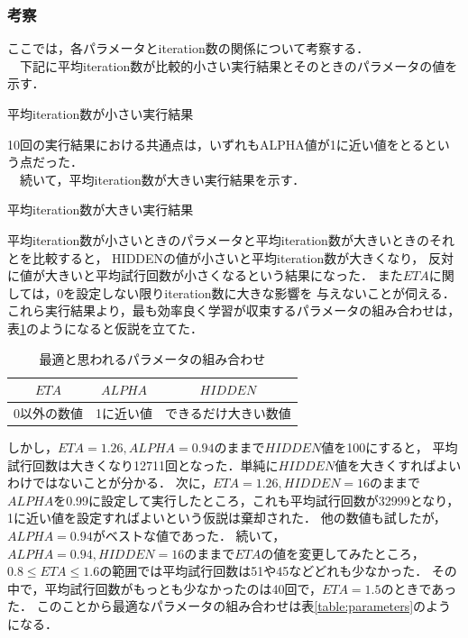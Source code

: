 \subsubsection{考察}
ここでは，各パラメータとiteration数の関係について考察する． \\
　下記に平均iteration数が比較的小さい実行結果とそのときのパラメータの値を示す．
\begin{itembox}[c]{平均iteration数が小さい実行結果}
    {\small
    }
\end{itembox}
10回の実行結果における共通点は，いずれもALPHA値が1に近い値をとるという点だった． \\
　続いて，平均iteration数が大きい実行結果を示す．

\begin{itembox}[c]{平均iteration数が大きい実行結果}
    {\small
    }
\end{itembox}

平均iteration数が小さいときのパラメータと平均iteration数が大きいときのそれとを比較すると，
HIDDENの値が小さいと平均iteration数が大きくなり，
反対に値が大きいと平均試行回数が小さくなるという結果になった．
また$ETA$に関しては，0を設定しない限りiteration数に大きな影響を
与えないことが伺える．
これら実行結果より，最も効率良く学習が収束するパラメータの組み合わせは，表\ref{table:parameters_prediction}のようになると仮説を立てた．

\begin{table}[htb]
 \begin{center}
  \begin{tabular}[htb]{|c|c|c|} \hline
   $ETA$ & $ALPHA$ & $HIDDEN$ \\ \hline \hline
   0以外の数値 & 1に近い値 & できるだけ大きい数値\\ \hline
  \end{tabular}
  \caption{最適と思われるパラメータの組み合わせ}
  \label{table:parameters_prediction}
 \end{center}
\end{table}

しかし，$ETA=1.26, ALPHA=0.94$のままで$HIDDEN$値を100にすると，
平均試行回数は大きくなり12711回となった．単純に$HIDDEN$値を大きくすればよいわけではないことが分かる．
次に，$ETA=1.26, HIDDEN=16$のままで$ALPHA$を0.99に設定して実行したところ，これも平均試行回数が32999となり，1に近い値を設定すればよいという仮説は棄却された．
他の数値も試したが，$ALPHA=0.94$がベストな値であった．
続いて，$ALPHA=0.94, HIDDEN=16$のままで$ETA$の値を変更してみたところ，$0.8 \le ETA \le 1.6$の範囲では平均試行回数は51や45などどれも少なかった．
その中で，平均試行回数がもっとも少なかったのは40回で，$ETA=1.5$のときであった．
このことから最適なパラメータの組み合わせは表\ref{table:parameters}のようになる．

